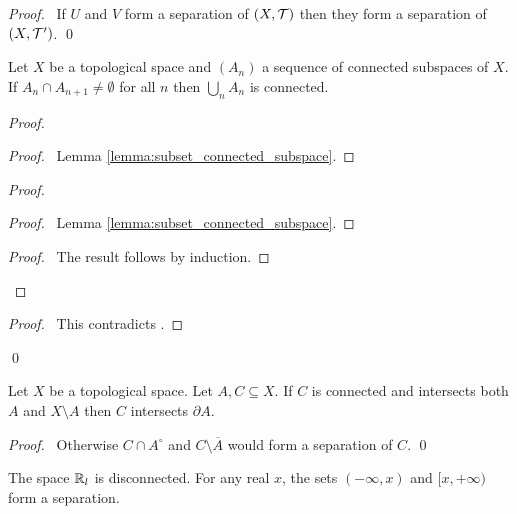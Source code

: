 \begin{proof}
    \pf\ If $U$ and $V$ form a separation of $(X, \mathcal{T})$ then they form a separation of $(X, \mathcal{T}')$. \qed
\end{proof}

\begin{proposition}
    Let $X$ be a topological space and $(A_n)$ a sequence of connected subspaces of $X$. If $A_n \cap A_{n+1} \neq \emptyset$ for all $n$ then $\bigcup_n A_n$ is
    connected.
\end{proposition}

\begin{proof}
    \pf
    \begin{proof}
        \pf\ Lemma \ref{lemma:subset_connected_subspace}.
    \end{proof}
    \begin{proof}
        \pf
        \begin{proof}
            \pf\ Lemma \ref{lemma:subset_connected_subspace}.
        \end{proof}
        \qedstep
        \begin{proof}
            \pf\ The result follows by induction.
        \end{proof}
    \end{proof}
    \qedstep
    \begin{proof}
        \pf\ This contradicts .
    \end{proof}
    \qed
\end{proof}

\begin{proposition}
    Let $X$ be a topological space. Let $A, C \subseteq X$. If $C$ is connected and intersects both $A$ and $X \setminus A$ then $C$ intersects $\partial A$.
\end{proposition}

\begin{proof}
    \pf\ Otherwise $C \cap A^\circ$ and $C \setminus \overline{A}$ would form a separation of $C$. \qed
\end{proof}

\begin{example}
    The space $\mathbb{R}_l$ is disconnected. For any real $x$, the sets $(- \infty, x)$ and $[x, +\infty)$ form a separation.
\end{example}

